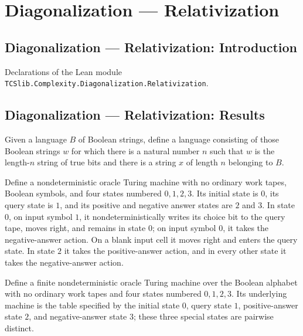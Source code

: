 \section{Diagonalization --- Relativization}
\subsection*{Diagonalization --- Relativization: Introduction}

Declarations of the Lean module \texttt{TCSlib.Complexity.Diagonalization.Relativization}.

\subsection*{Diagonalization --- Relativization: Results}

\begin{definition}
\label{Complexity.unaryWitnessLang}
\leanok
Given a language $B$ of Boolean strings, define a language consisting of those Boolean
strings $w$ for which there is a natural number $n$ such that $w$ is the length-$n$
string of true bits and there is a string $x$ of length $n$ belonging to $B$.
\end{definition}

\begin{definition}
\label{Complexity.uwTable}
\leanok
{}
Define a nondeterministic oracle Turing machine with no ordinary work tapes, Boolean
symbols, and four states numbered $0,1,2,3$. Its initial state is $0$, its query state
is $1$, and its positive and negative answer states are $2$ and $3$. In state $0$, on
input symbol $1$, it nondeterministically writes its choice bit to the query tape, moves
right, and remains in state $0$; on input symbol $0$, it takes the negative-answer
action. On a blank input cell it moves right and enters the query state. In state $2$ it
takes the positive-answer action, and in every other state it takes the negative-answer
action.
\end{definition}

\begin{definition}
\label{Complexity.uwTM}
\leanok
{}
Define a finite nondeterministic oracle Turing machine over the Boolean alphabet with no
ordinary work tapes and four states numbered $0,1,2,3$. Its underlying machine is the
table specified by the initial state $0$, query state $1$, positive-answer state $2$,
and negative-answer state $3$; these three special states are pairwise distinct.
\end{definition}

